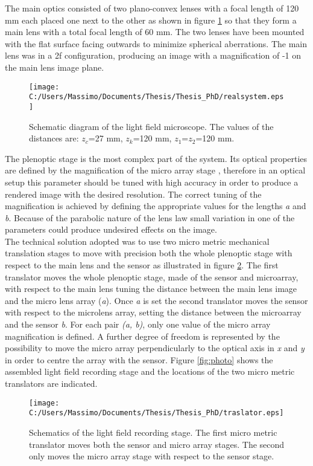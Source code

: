 The main optics consisted of two plano-convex lenses with a focal length of 120 mm each placed one next to the other as shown in figure \ref{fig:realsys} so that they form a main lens with a total focal length of 60 mm. The two lenses have been mounted with the flat surface facing outwards to minimize spherical aberrations. The main lens was in a 2f configuration, producing an image with a magnification of -1 on the main lens image plane. 
\newpage
\begin{figure}[H]
	\centering
	\texttt{[image: C:/Users/Massimo/Documents/Thesis/Thesis\_PhD/realsystem.eps]}
	\caption{\label{fig:realsys} Schematic diagram of the light field microscope. The values of the distances are: $z_c$=27 mm, $z_k$=120 mm, $z_1$=$z_2$=120 mm.
 }
\end{figure}
The plenoptic stage is the most complex part of the system. Its optical properties are defined by the magnification of the micro array stage \cite{turola2014wave,georgiev2010focused}, therefore in an optical setup this parameter should be tuned with high accuracy in order to produce a rendered image with the desired resolution. The correct tuning of the magnification is achieved by defining the appropriate values for the lengths \textit{a} and \textit{b}. Because of the parabolic nature of the lens law small variation in one of the parameters could produce undesired effects on the image.\\
The technical solution adopted was to use two micro metric mechanical translation stages to move with precision both the whole plenoptic stage with respect to the main lens and the sensor as illustrated in figure \ref{fig:traslator}. The first translator moves the whole plenoptic stage, made of the sensor and microarray, with respect to the main lens tuning the distance between the main lens image and the micro lens array (\textit{a}). Once \textit{a} is set the second translator moves the sensor with respect to the microlens array, setting the distance between the microarray and the sensor \textit{b}. For each pair \textit{(a, b)}, only one value of the micro array magnification is defined. A further degree of freedom is represented by the possibility to move the micro array perpendicularly to the optical axis in \textit{x} and \textit{y} in order to centre the array with the sensor.
Figure \ref{fig:photo} shows the assembled light field recording stage and the locations of the two micro metric translators are indicated.
\begin{figure}[H]
	\centering
	\texttt{[image: C:/Users/Massimo/Documents/Thesis/Thesis\_PhD/traslator.eps]}
	\caption{\label{fig:traslator} Schematics of the light field recording stage. The first micro metric translator moves both the sensor and micro array stages. The second only moves the micro array stage with respect to the sensor stage. }
\end{figure}
